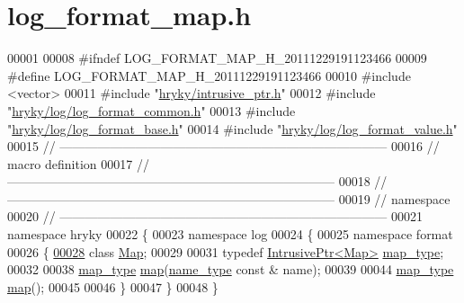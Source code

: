 \hypertarget{log__format__map_8h_source}{\section{log\-\_\-format\-\_\-map.\-h}
}

\begin{DoxyCode}
00001 
00008 \textcolor{preprocessor}{#ifndef LOG\_FORMAT\_MAP\_H\_20111229191123466}
00009 \textcolor{preprocessor}{}\textcolor{preprocessor}{#define LOG\_FORMAT\_MAP\_H\_20111229191123466}
00010 \textcolor{preprocessor}{}\textcolor{preprocessor}{#include <vector>}
00011 \textcolor{preprocessor}{#include "\hyperlink{intrusive__ptr_8h}{hryky/intrusive_ptr.h}"}
00012 \textcolor{preprocessor}{#include "\hyperlink{log__format__common_8h}{hryky/log/log_format_common.h}"}
00013 \textcolor{preprocessor}{#include "\hyperlink{log__format__base_8h}{hryky/log/log_format_base.h}"}
00014 \textcolor{preprocessor}{#include "\hyperlink{log__format__value_8h}{hryky/log/log_format_value.h}"}
00015 \textcolor{comment}{//
      ------------------------------------------------------------------------------}
00016 \textcolor{comment}{// macro definition}
00017 \textcolor{comment}{//
      ------------------------------------------------------------------------------}
00018 \textcolor{comment}{//
      ------------------------------------------------------------------------------}
00019 \textcolor{comment}{// namespace}
00020 \textcolor{comment}{//
      ------------------------------------------------------------------------------}
00021 \textcolor{keyword}{namespace }hryky
00022 \{
00023 \textcolor{keyword}{namespace }log
00024 \{
00025 \textcolor{keyword}{namespace }format
00026 \{
\hypertarget{log__format__map_8h_source_l00028}{}\hyperlink{namespacehryky_1_1log_1_1format_aca5654dc79f5b065700e17790f2aa701}{00028}     \textcolor{keyword}{class }\hyperlink{classhryky_1_1log_1_1format_1_1_map}{Map};
00029 
00031     \textcolor{keyword}{typedef} \hyperlink{classhryky_1_1_intrusive_ptr}{IntrusivePtr<Map>} \hyperlink{namespacehryky_1_1log_1_1format_aca5654dc79f5b065700e17790f2aa701}{map_type};
00032 
00038     \hyperlink{classhryky_1_1_intrusive_ptr}{map_type} \hyperlink{namespacehryky_1_1log_1_1format_ab2b4123702f3dd9467a1d4db34d8d36b}{map}(\hyperlink{namespacehryky_1_1log_1_1format_ab7408d1e2ed2d648dbf9bba69eb74288}{name_type} \textcolor{keyword}{const} & name);
00039 
00044     \hyperlink{classhryky_1_1_intrusive_ptr}{map_type} \hyperlink{namespacehryky_1_1log_1_1format_ab2b4123702f3dd9467a1d4db34d8d36b}{map}();
00045 
00046 \}
00047 \}
00048 \}

\end{DoxyCode}
